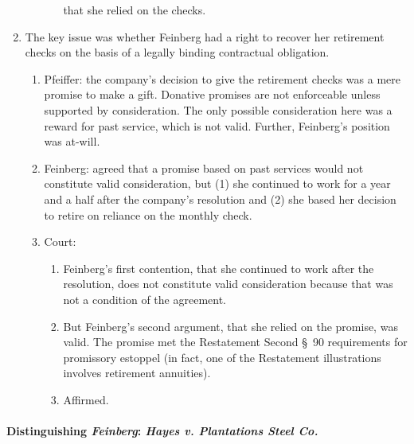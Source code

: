 \begin{enumerate}
\begin{enumerate}
\begin{enumerate}
            that she relied on the checks.
        \end{enumerate}
    \end{enumerate}
    \item The key issue was whether Feinberg had a right to recover her 
    retirement checks on the basis of a legally binding contractual 
    obligation.
    \begin{enumerate}
        \item Pfeiffer: the company's decision to give the retirement checks 
        was a mere promise to make a gift. Donative promises are not 
        enforceable unless supported by consideration. The only possible 
        consideration here was a reward for past service, which is not valid. 
        Further, Feinberg's position was at-will.
        \item Feinberg: agreed that a promise based on past services would not 
        constitute valid consideration, but (1) she continued to work for a 
        year and a half after the company's resolution and (2) she based her 
        decision to retire on reliance on the monthly check.
        \item Court: 
        \begin{enumerate}
            \item Feinberg's first contention, that she continued to work 
            after the resolution, does not constitute valid consideration 
            because that was not a condition of the agreement.
            \item But Feinberg's second argument, that she relied on the 
            promise, was valid. The promise met the Restatement Second \S\ 90 
            requirements for promissory estoppel (in fact, one of the 
            Restatement illustrations involves retirement annuities).
            \item Affirmed.
        \end{enumerate}
    \end{enumerate}
\end{enumerate}

\paragraph{Distinguishing \emph{Feinberg}: \emph{Hayes v. Plantations 
Steel Co.}}

